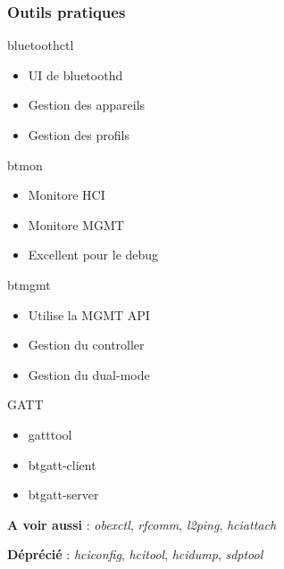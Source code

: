 \begin{frame}
	\frametitle{Outils pratiques}
	\begin{minipage}{0.46\linewidth}
		\begin{block}{bluetoothctl}
			\begin{itemize}
				\item UI de bluetoothd
				\item Gestion des appareils
				\item Gestion des profils
			\end{itemize}
		\end{block}
		\begin{block}{btmon}
			\begin{itemize}
				\item Monitore HCI
				\item Monitore MGMT
				\item Excellent pour le debug
			\end{itemize}
		\end{block}
	\end{minipage}
	\begin{minipage}{0.46\linewidth}
		\begin{block}{btmgmt}
			\begin{itemize}
				\item Utilise la MGMT API
				\item Gestion du controller
				\item Gestion du dual-mode
			\end{itemize}
		\end{block}
		\begin{block}{GATT}
			\begin{itemize}
				\item gatttool
				\item btgatt-client
				\item btgatt-server
			\end{itemize}
		\end{block}
	\end{minipage}
	\vspace{0.5cm}
	\small{

	\textbf{A voir aussi} : \textit{obexctl}, \textit{rfcomm}, \textit{l2ping}, \textit{hciattach}

	\textbf{Déprécié} : \textit{hciconfig}, \textit{hcitool}, \textit{hcidump}, \textit{sdptool}
	}

\end{frame}

